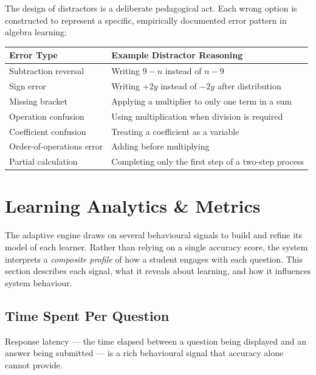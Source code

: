 \documentclass[12pt,a4paper]{article}
\begin{document}
The design of distractors is a deliberate pedagogical act.  Each wrong option
is constructed to represent a specific, empirically documented error pattern
in algebra learning:

\begin{center}
\begin{tabular}{ll}
  \toprule
  \textbf{Error Type} & \textbf{Example Distractor Reasoning} \\
  \midrule
  Subtraction reversal     & Writing $9 - n$ instead of $n - 9$ \\
  Sign error               & Writing $+2y$ instead of $-2y$ after distribution \\
  Missing bracket          & Applying a multiplier to only one term in a sum \\
  Operation confusion      & Using multiplication when division is required \\
  Coefficient confusion    & Treating a coefficient as a variable \\
  Order-of-operations error& Adding before multiplying \\
  Partial calculation      & Completing only the first step of a two-step process \\
  \bottomrule
\end{tabular}
\end{center}

\section{Learning Analytics \& Metrics}

The adaptive engine draws on several behavioural signals to build and refine
its model of each learner.  Rather than relying on a single accuracy score,
the system interprets a \emph{composite profile} of how a student engages
with each question.  This section describes each signal, what it reveals
about learning, and how it influences system behaviour.

\subsection{Time Spent Per Question}

Response latency — the time elapsed between a question being displayed and an
answer being submitted — is a rich behavioural signal that accuracy alone
cannot provide.
\end{document}
